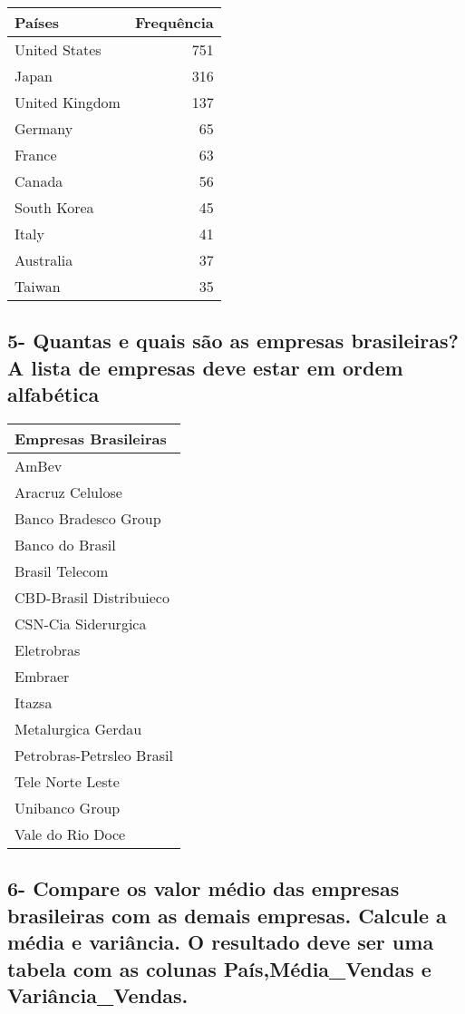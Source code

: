 \documentclass[
]{article}
\newenvironment{Shaded}{\begin{snugshade}}{\end{snugshade}}
\newcommand{\DataTypeTok}[1]{\textcolor[rgb]{0.13,0.29,0.53}{#1}}
\newcommand{\KeywordTok}[1]{\textcolor[rgb]{0.13,0.29,0.53}{\textbf{#1}}}
\newcommand{\NormalTok}[1]{#1}
\newcommand{\OperatorTok}[1]{\textcolor[rgb]{0.81,0.36,0.00}{\textbf{#1}}}
\newcommand{\OtherTok}[1]{\textcolor[rgb]{0.56,0.35,0.01}{#1}}
\newcommand{\StringTok}[1]{\textcolor[rgb]{0.31,0.60,0.02}{#1}}
\begin{document}
\begin{longtable}[]{@{}lr@{}}
\toprule
Países & Frequência\tabularnewline
\midrule
\endhead
United States & 751\tabularnewline
Japan & 316\tabularnewline
United Kingdom & 137\tabularnewline
Germany & 65\tabularnewline
France & 63\tabularnewline
Canada & 56\tabularnewline
South Korea & 45\tabularnewline
Italy & 41\tabularnewline
Australia & 37\tabularnewline
Taiwan & 35\tabularnewline
\bottomrule
\end{longtable}

\hypertarget{quantas-e-quais-suxe3o-as-empresas-brasileiras-a-lista-de-empresas-deve-estar-em-ordem-alfabuxe9tica}{%
\subsection{5- Quantas e quais são as empresas brasileiras? A lista de
empresas deve estar em ordem
alfabética}\label{quantas-e-quais-suxe3o-as-empresas-brasileiras-a-lista-de-empresas-deve-estar-em-ordem-alfabuxe9tica}}

\begin{Shaded}
\end{Shaded}

\begin{longtable}[]{@{}l@{}}
\toprule
Empresas Brasileiras\tabularnewline
\midrule
\endhead
AmBev\tabularnewline
Aracruz Celulose\tabularnewline
Banco Bradesco Group\tabularnewline
Banco do Brasil\tabularnewline
Brasil Telecom\tabularnewline
CBD-Brasil Distribuieco\tabularnewline
CSN-Cia Siderurgica\tabularnewline
Eletrobras\tabularnewline
Embraer\tabularnewline
Itazsa\tabularnewline
Metalurgica Gerdau\tabularnewline
Petrobras-Petrsleo Brasil\tabularnewline
Tele Norte Leste\tabularnewline
Unibanco Group\tabularnewline
Vale do Rio Doce\tabularnewline
\bottomrule
\end{longtable}

\hypertarget{compare-os-valor-muxe9dio-das-empresas-brasileiras-com-as-demais-empresas.-calcule-a-muxe9dia-e-variuxe2ncia.-o-resultado-deve-ser-uma-tabela-com-as-colunas-pauxedsmuxe9dia_vendas-e-variuxe2ncia_vendas.}{%
\subsection{6- Compare os valor médio das empresas brasileiras com as
demais empresas. Calcule a média e variância. O resultado deve ser uma
tabela com as colunas País,Média\_Vendas e
Variância\_Vendas.}\label{compare-os-valor-muxe9dio-das-empresas-brasileiras-com-as-demais-empresas.-calcule-a-muxe9dia-e-variuxe2ncia.-o-resultado-deve-ser-uma-tabela-com-as-colunas-pauxedsmuxe9dia_vendas-e-variuxe2ncia_vendas.}}
\end{document}
